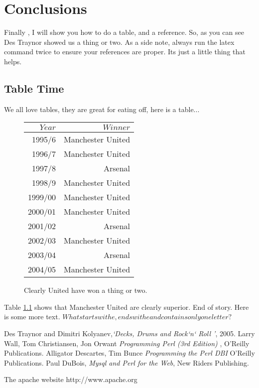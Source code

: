 \documentclass[12pt,a4paper]{report}
\begin{document}
\chapter{Conclusions}
Finally , I will show you how to do a table, and a reference. 
So, as you can see Des Traynor\cite{DesTraynor} showed us a thing or two. As a side note, always run the latex command twice to ensure your references
are proper. Its just a little thing that helps. 
\section{Table Time}
We all love tables, they are great for eating off, here is a table...
\begin{figure}[tbhp]
\begin{center}

\label{tab:football}
\begin{tabular}{|r|r|}
\hline
$Year$&$Winner$\\
\hline
1995/6&Manchester United\\
1996/7&Manchester United\\
1997/8&Arsenal\\
1998/9&Manchester United\\
1999/00&Manchester United\\
2000/01&Manchester United\\
2001/02&Arsenal\\
2002/03&Manchester United\\
2003/04&Arsenal\\
2004/05&Manchester United\\
\hline
\end{tabular}
\caption{Clearly United have won a thing or two.}
\end{center}
\end{figure}

Table \ref{tab:football} shows that Manchester United are clearly superior. End of story. Here is some more text. 
$What starts with e , ends with e and contains only one letter?$ 

\renewcommand{\bibname}{References}
\begin{thebibliography}{}
Des Traynor and Dimitri Kolyanev,{\it `Decks, Drums and Rock`n` Roll '}, 2005.
Larry Wall, Tom Christiansen, Jon Orwant {\it Programming Perl (3rd Edition)} , O'Reilly Publications.
Alligator Descartes, Tim Bunce {\it Programming the Perl DBI}  O'Reilly Publications.
Paul DuBois, {\it Mysql and Perl for the Web}, New Riders Publishing.

The apache website http://www.apache.org
\end{thebibliography}
\end{document}

